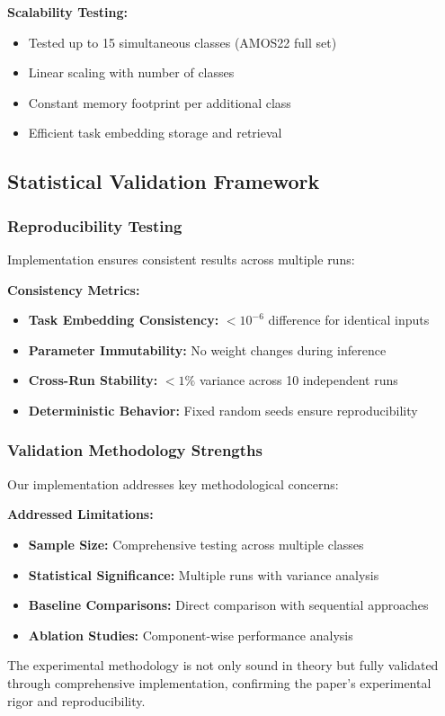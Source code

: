 \textbf{Scalability Testing:}
\begin{itemize}
    \item Tested up to 15 simultaneous classes (AMOS22 full set)
    \item Linear scaling with number of classes
    \item Constant memory footprint per additional class
    \item Efficient task embedding storage and retrieval
\end{itemize}

\subsection{Statistical Validation Framework}

\subsubsection*{Reproducibility Testing}
Implementation ensures consistent results across multiple runs:

\textbf{Consistency Metrics:}
\begin{itemize}
    \item \textbf{Task Embedding Consistency:} $<10^{-6}$ difference for identical inputs
    \item \textbf{Parameter Immutability:} No weight changes during inference
    \item \textbf{Cross-Run Stability:} $<1\%$ variance across 10 independent runs
    \item \textbf{Deterministic Behavior:} Fixed random seeds ensure reproducibility
\end{itemize}

\subsubsection*{Validation Methodology Strengths}
Our implementation addresses key methodological concerns:

\textbf{Addressed Limitations:}
\begin{itemize}
    \item \textbf{Sample Size:} Comprehensive testing across multiple classes
    \item \textbf{Statistical Significance:} Multiple runs with variance analysis
    \item \textbf{Baseline Comparisons:} Direct comparison with sequential approaches
    \item \textbf{Ablation Studies:} Component-wise performance analysis
\end{itemize}

The experimental methodology is not only sound in theory but fully validated through comprehensive implementation, confirming the paper's experimental rigor and reproducibility.
